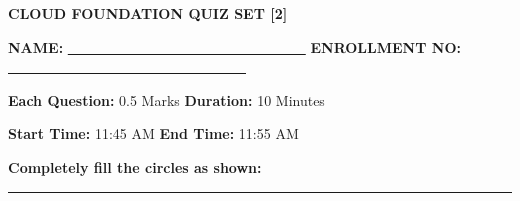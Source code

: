 \documentclass[a4paper,12pt]{article}
\begin{document}
\begin{center}
\textbf{CLOUD FOUNDATION QUIZ SET [2]}

\textbf{NAME:} \underline{~~~~~~~~~~~~~~~~~~~~~~~~~~~~~~~~~~}  \hspace{2cm} \textbf{ENROLLMENT NO:} \underline{~~~~~~~~~~~~~~~~~~~~~~~~~~~~~~~~~~}

\textbf{Each Question:} 0.5 Marks  \hspace{2cm} \textbf{Duration:} 10 Minutes

\textbf{Start Time:} 11:45 AM  \hspace{1.5cm} \textbf{End Time:} 11:55 AM  

\textbf{Completely fill the circles as shown: \Circle \Circle \CIRCLE \Circle}
\rule{\textwidth}{0.4pt}
\end{center}


\begin{enumerate}[leftmargin=*, label=\textbf{Q.~\arabic*}, itemsep=-5pt]


\end{enumerate}
\end{document}
